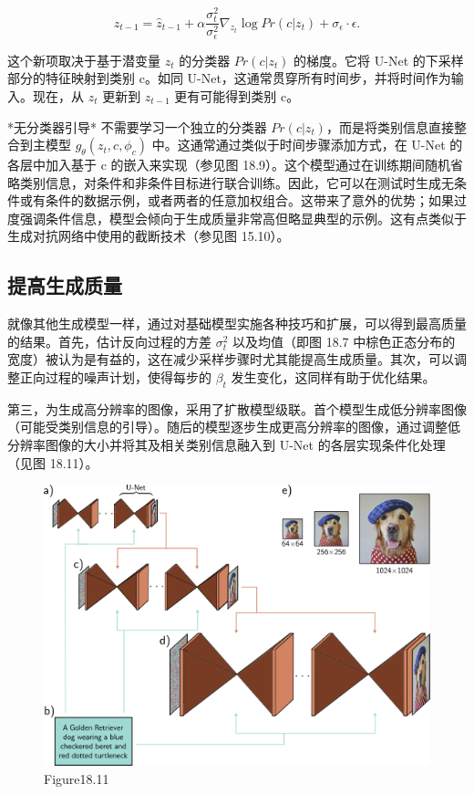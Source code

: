 \[
z_{t-1} = \hat{z}_{t-1} + \alpha \frac{\sigma^2_t}{\sigma^2_{\epsilon}} \nabla_{z_t} \log Pr(c|z_t) + \sigma_{\epsilon} \cdot \epsilon. \tag{18.40}
\]

这个新项取决于基于潜变量 \(z_t\) 的分类器 \(Pr(c|z_t)\) 的梯度。它将 U-Net 的下采样部分的特征映射到类别 c。如同 U-Net，这通常贯穿所有时间步，并将时间作为输入。现在，从 \(z_t\) 更新到 \(z_{t-1}\) 更有可能得到类别 c。

*无分类器引导* 不需要学习一个独立的分类器 \(Pr(c|z_t)\)，而是将类别信息直接整合到主模型 \(g_{\theta}(z_t, c, \phi_c)\) 中。这通常通过类似于时间步骤添加方式，在 U-Net 的各层中加入基于 c 的嵌入来实现（参见图 18.9）。这个模型通过在训练期间随机省略类别信息，对条件和非条件目标进行联合训练。因此，它可以在测试时生成无条件或有条件的数据示例，或者两者的任意加权组合。这带来了意外的优势；如果过度强调条件信息，模型会倾向于生成质量非常高但略显典型的示例。这有点类似于生成对抗网络中使用的截断技术（参见图 15.10）。

\subsection{提高生成质量}
就像其他生成模型一样，通过对基础模型实施各种技巧和扩展，可以得到最高质量的结果。首先，估计反向过程的方差 \(\sigma_t^2\) 以及均值（即图 18.7 中棕色正态分布的宽度）被认为是有益的，这在减少采样步骤时尤其能提高生成质量。其次，可以调整正向过程的噪声计划，使得每步的 \(\beta_t\) 发生变化，这同样有助于优化结果。

第三，为生成高分辨率的图像，采用了扩散模型级联。首个模型生成低分辨率图像（可能受类别信息的引导）。随后的模型逐步生成更高分辨率的图像，通过调整低分辨率图像的大小并将其及相关类别信息融入到 U-Net 的各层实现条件化处理（见图 18.11）。

\begin{figure}[h!]
\centering
\includegraphics[width=0.7\linewidth]{png/chapter18/DiffusionCascade.png}
\caption{Figure18.11}
\end{figure}


